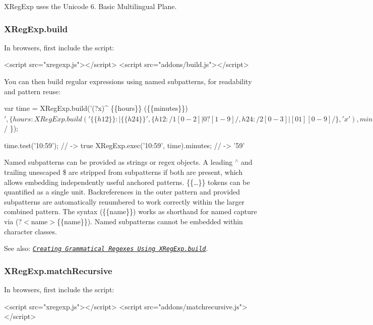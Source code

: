 X\+Reg\+Exp uses the Unicode 6. Basic Multilingual Plane.

\subsubsection*{X\+Reg\+Exp.\+build}

In browsers, first include the script\+:


\begin{DoxyCode}
<script src="xregexp.js"></script>
<script src="addons/build.js"></script>
\end{DoxyCode}


You can then build regular expressions using named subpatterns, for readability and pattern reuse\+:


\begin{DoxyCode}
var time = XRegExp.build('(?x)^ \{\{hours\}\} (\{\{minutes\}\}) $', \{
    hours: XRegExp.build('\{\{h12\}\} : | \{\{h24\}\}', \{
        h12: /1[0-2]|0?[1-9]/,
        h24: /2[0-3]|[01][0-9]/
    \}, 'x'),
    minutes: /^[0-5][0-9]$/
\});

time.test('10:59'); // -> true
XRegExp.exec('10:59', time).minutes; // -> '59'
\end{DoxyCode}


Named subpatterns can be provided as strings or regex objects. A leading {\ttfamily $^\wedge$} and trailing unescaped {\ttfamily \$} are stripped from subpatterns if both are present, which allows embedding independently useful anchored patterns. {\ttfamily \{\{…\}\}} tokens can be quantified as a single unit. Backreferences in the outer pattern and provided subpatterns are automatically renumbered to work correctly within the larger combined pattern. The syntax {\ttfamily (\{\{name\}\})} works as shorthand for named capture via {\ttfamily (?$<$name$>$\{\{name\}\})}. Named subpatterns cannot be embedded within character classes.

See also\+: {\itshape \href{http://blog.stevenlevithan.com/archives/grammatical-patterns-xregexp-build}{\tt Creating Grammatical Regexes Using X\+Reg\+Exp.\+build}}.

\subsubsection*{X\+Reg\+Exp.\+match\+Recursive}

In browsers, first include the script\+:


\begin{DoxyCode}
<script src="xregexp.js"></script>
<script src="addons/matchrecursive.js"></script>
\end{DoxyCode}



